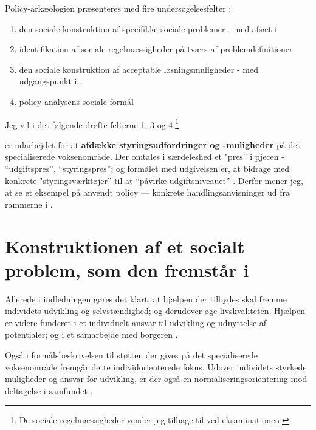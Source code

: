 Policy-arkæologien præsenteres med fire undersøgelsesfelter \autocite[s. 300]{scheurichPolicyArchaeologyNew1994}:
\begin{enumerate}
  \item
    den sociale konstruktion af specifikke sociale problemer - med afsæt i 
  \item
    identifikation af sociale regelmæssigheder på tværs af problemdefinitioner
  \item
    den sociale konstruktion af acceptable løsningsmuligheder - med udgangspunkt i .
  \item
    policy-analysens sociale formål
\end{enumerate}

Jeg vil i det følgende drøfte felterne 1, 3 og 4.\footnote{De sociale regelmæssigheder vender jeg tilbage til ved eksaminationen.}

 er udarbejdet for at \textbf{afdække styringsudfordringer og -muligheder} på det specialiserede voksenområde.
Der omtales i særdeleshed et "pres” i pjecen - “udgiftspres”, “styringspres”; og formålet med udgivelsen er, at bidrage med konkrete "styringsværktøjer” til at “påvirke udgiftsniveauet” \autocite[s. 2, 3. m.fl.]{klStyringAfDet2017}.
Derfor mener jeg, at se et eksempel på anvendt policy — konkrete handlingsanvisninger ud fra rammerne i .

\section{Konstruktionen af et socialt problem, som den fremstår i }

Allerede i indledningen gøres det klart, at hjælpen der tilbydes skal fremme individets udvikling og selvstændighed; og derudover øge livskvaliteten.
Hjælpen er videre funderet i et individuelt ansvar til udvikling og udnyttelse af potentialer; og i et samarbejde med borgeren \autocite[§§ 2-3]{social-ogindenrigsministerietBekendtgorelseAfLov2019}.

Også i formålsbeskrivelsen til støtten der gives på det specialiserede voksenområde fremgår  dette individorienterede fokus.
Udover individets styrkede muligheder og ansvar for udvikling, er der også en normaliseringsorientering mod deltagelse i samfundet \autocite[§ 81]{social-ogindenrigsministerietBekendtgorelseAfLov2019}.

